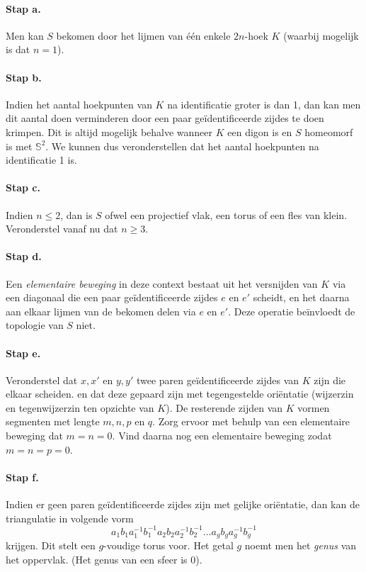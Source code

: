 \documentclass[12pt]{book}
\begin{document}
\paragraph{Stap a.}
Men kan $S$ bekomen door het lijmen van \'e\'en enkele $2n$-hoek $K$ (waarbij mogelijk is dat $n=1$).
\paragraph{Stap b.}
Indien het aantal hoekpunten van $K$ na identificatie groter is dan 1, dan kan men dit aantal doen verminderen door een paar ge\"identificeerde zijdes te doen krimpen. Dit is altijd mogelijk behalve wanneer $K$ een digon is en $S$ homeomorf is met $\mathbb{S}^2$. We kunnen dus veronderstellen dat het aantal hoekpunten na identificatie 1 is.
\paragraph{Stap c.}
Indien $n \leq 2$, dan is $S$ ofwel een projectief vlak, een torus of een fles van klein. Veronderstel vanaf nu dat $n \geq 3$.
\paragraph{Stap d.}
Een {\em elementaire beweging} in deze context bestaat uit het versnijden van $K$ via een diagonaal die een paar ge\"identificeerde zijdes $e$ en $e'$ scheidt, en het daarna aan elkaar lijmen van de bekomen delen via $e$ en $e'$. Deze operatie be\"invloedt de topologie van $S$ niet.
\paragraph{Stap e.}
Veronderstel dat $x,x'$ en $y,y'$ twee paren ge\"identificeerde zijdes van $K$ zijn die elkaar scheiden. en dat deze gepaard zijn met tegengestelde  ori\"entatie (wijzerzin en tegenwijzerzin ten opzichte van $K$). De resterende zijden van $K$ vormen segmenten  met lengte $m,n,p$ en $q$. Zorg ervoor met behulp van een elementaire beweging dat $m= n=0$. Vind daarna nog een elementaire beweging zodat $m=n=p=0$.
\paragraph{Stap f.}
Indien er geen paren ge\"identificeerde zijdes zijn met gelijke ori\"entatie, dan kan de triangulatie in volgende vorm 
$$
a_1b_1a_1^{-1}b_1^{-1} a_2b_2a_2^{-1}b_2^{-1}  \dots a_gb_ga_g^{-1}b_g^{-1} 
$$
krijgen. Dit stelt een $g$-voudige torus voor. Het getal $g$ noemt men het \emph{genus} van het oppervlak. (Het genus van een sfeer is 0).
\end{document}
